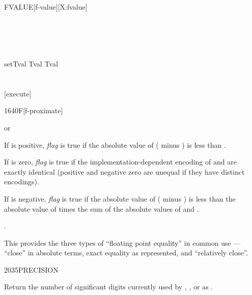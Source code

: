 \begin{worddef}{}{FVALUE}[f-value][X:fvalue]
	\begin{testing}\ttfamily
		 \\
		 \\
		 \\
		 \\[2ex]
		\word{:} setTval Tval   Tval \word{;} \\
		 \\[2ex]
		 \\
		\word{:} [execute]  \word{;}  \\
		\test[R]{\word{'} Tval \word{]} [execute] \word{[}}{2e0}
	\end{testing}
\end{worddef}


\begin{worddef}[Ftilde]{1640}{F\tilde}[f-proximate]
\item {}  or

	If  is positive, \emph{flag} is true if the absolute
	value of ( minus ) is less than .

	If  is zero, \emph{flag} is true if the
	implementation-dependent encoding of  and 
	are exactly identical (positive and negative zero are unequal if
	they have distinct encodings).

	If  is negative, \emph{flag} is true if the absolute value
	of ( minus ) is less than the absolute value of
	 times the sum of the absolute values of  and
	.

\see {}.

	\begin{rationale} %
		This provides the three types of ``floating point equality''
		in common use --- ``close'' in absolute terms, exact equality
		as represented, and ``relatively close''.
	\end{rationale}
\end{worddef}


\begin{worddef}{2035}{PRECISION}
\item {}

	Return the number of significant digits currently used by
	, , or  as .
\end{worddef}


